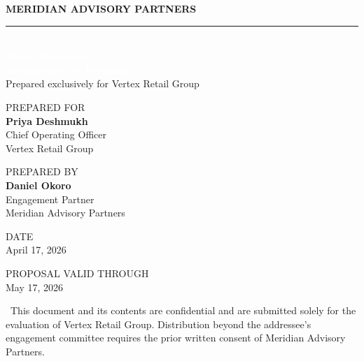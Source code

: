 \thispagestyle{empty}
\vspace*{-1cm}

\begin{tcolorbox}[colback=primary, colframe=accent, boxrule=0pt,
  bottomrule=2.4pt, arc=0pt, left=18pt, right=18pt, top=1.3cm, bottom=1.3cm]
  \textcolor{accentlight}{\Large\bfseries MERIDIAN ADVISORY PARTNERS}\\[0.3cm]
  {\color{white}\rule{4cm}{1pt}}\\[1.4cm]
  \textcolor{white}{\fontsize{30}{36}\selectfont\bfseries Retail Operations}\\[0.15cm]
  \textcolor{white}{\fontsize{30}{36}\selectfont\bfseries Transformation Proposal}\\[0.8cm]
  \textcolor{accentlight}{\large Prepared exclusively for Vertex Retail Group}
\end{tcolorbox}

\vspace{1.6cm}

\begin{minipage}[t]{0.48\textwidth}
  \small
  \textcolor{mutedtext}{PREPARED FOR}\\[3pt]
  {\color{darktext}\bfseries Priya Deshmukh}\\
  {\color{darktext}Chief Operating Officer}\\
  {\color{darktext}Vertex Retail Group}
\end{minipage}%
\begin{minipage}[t]{0.48\textwidth}
  \small
  \textcolor{mutedtext}{PREPARED BY}\\[3pt]
  {\color{darktext}\bfseries Daniel Okoro}\\
  {\color{darktext}Engagement Partner}\\
  {\color{darktext}Meridian Advisory Partners}
\end{minipage}

\vspace{1cm}

\begin{minipage}[t]{0.48\textwidth}
  \small
  \textcolor{mutedtext}{DATE}\\[3pt]
  {\color{darktext} April 17, 2026}
\end{minipage}%
\begin{minipage}[t]{0.48\textwidth}
  \small
  \textcolor{mutedtext}{PROPOSAL VALID THROUGH}\\[3pt]
  {\color{darktext} May 17, 2026}
\end{minipage}

\vfill

\begin{tcolorbox}[colback=lightbg, colframe=bordercolor, boxrule=0.6pt, arc=2pt,
  left=12pt, right=12pt, top=8pt, bottom=8pt]
  \small\color{mutedtext}
  \faLock\ This document and its contents are confidential and are submitted solely for the
  evaluation of Vertex Retail Group. Distribution beyond the addressee's engagement
  committee requires the prior written consent of Meridian Advisory Partners.
\end{tcolorbox}
